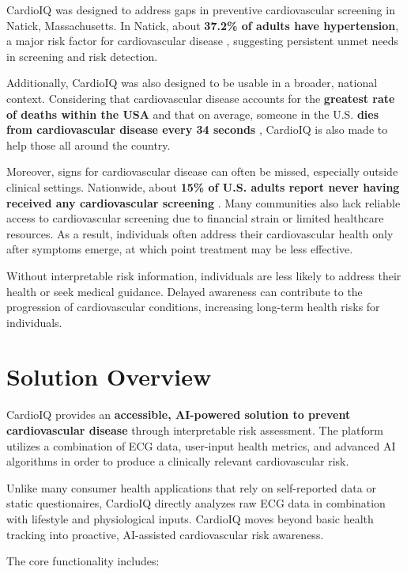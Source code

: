 \documentclass[12pt]{article}
\begin{document}
CardioIQ was designed to address gaps in preventive cardiovascular screening in Natick, Massachusetts. In Natick, about \textbf{37.2\% of adults have hypertension}, a major risk factor for cardiovascular disease \cite{natickCHNA2025}, suggesting persistent unmet needs in screening and risk detection.


Additionally, CardioIQ was also designed to be usable in a broader, national context. Considering that cardiovascular disease accounts for the \textbf{greatest rate of deaths within the USA} and that on average, someone in the U.S. \textbf{dies from cardiovascular disease every 34 seconds }\cite{ahaCVDdeaths2025}, CardioIQ is also made to help those all around the country. 

Moreover, signs for cardiovascular disease can often be missed, especially outside clinical settings. Nationwide, about \textbf{15\% of U.S. adults report never having received any cardiovascular screening} \cite{cdcHeartScreening2024}. Many communities also lack reliable access to cardiovascular screening due to financial strain or limited healthcare resources. As a result, individuals often address their cardiovascular health only after symptoms emerge, at which point treatment may be less effective.

Without interpretable risk information, individuals are less likely to address their health or seek medical guidance. Delayed awareness can contribute to the progression of cardiovascular conditions, increasing long-term health risks for individuals.

\section*{Solution Overview}

CardioIQ provides an \textbf{accessible, AI-powered solution to prevent cardiovascular disease} through interpretable risk assessment. The platform utilizes a combination of ECG data, user-input health metrics, and advanced AI algorithms in order to produce a clinically relevant cardiovascular risk. 

Unlike many consumer health applications that rely on self-reported data or static questionaires, CardioIQ directly analyzes raw ECG data in combination with lifestyle and physiological inputs. CardioIQ moves beyond basic health tracking into proactive, AI-assisted cardiovascular risk awareness. 

The core functionality includes:  
\end{document}
